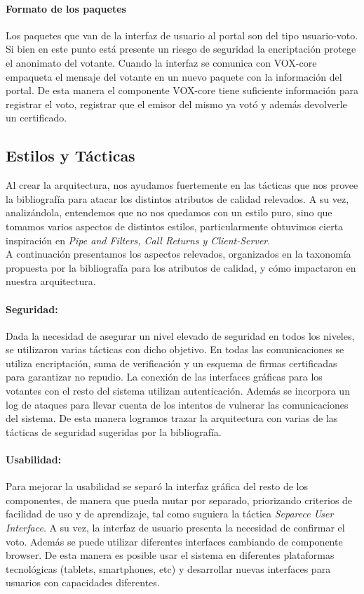 \paragraph{Formato de los paquetes} Los paquetes que van de la interfaz de usuario al portal son del tipo usuario-voto. Si bien en este punto está presente un riesgo de seguridad la encriptación protege el anonimato del votante. Cuando la interfaz se comunica con VOX-core empaqueta el mensaje del votante en un nuevo paquete con la información del portal. De esta manera el componente VOX-core tiene suficiente información para registrar el voto, registrar que el emisor del mismo ya votó y además devolverle un certificado.

\subsection{Estilos y Tácticas}

Al crear la arquitectura, nos ayudamos fuertemente en las tácticas que nos provee la bibliografía para atacar los distintos atributos de calidad relevados. A su vez, analizándola, entendemos que no nos quedamos con un estilo puro, sino que tomamos varios aspectos de distintos estilos, particularmente obtuvimos cierta inspiración en \textit{Pipe and Filters, Call Returns y Client-Server}. \\ A continuación presentamos los aspectos relevados, organizados en la taxonomía propuesta por la bibliografía para los atributos de calidad, y cómo impactaron en nuestra arquitectura.
 

\paragraph{Seguridad:}
Dada la necesidad de asegurar un nivel elevado de seguridad en todos los niveles, se utilizaron varias tácticas con dicho objetivo. En todas las comunicaciones se utiliza encriptación, suma de verificación y un esquema de firmas certificadas para garantizar no repudio. La conexión de las interfaces gráficas para los votantes con el resto del sistema utilizan autenticación. Además se incorpora un log de ataques para llevar cuenta de los intentos de vulnerar las comunicaciones del sistema. De esta manera logramos trazar la arquitectura con varias de las tácticas de seguridad sugeridas por la bibliografía.

\paragraph{Usabilidad:}
Para mejorar la usabilidad se separó la interfaz gráfica del resto de los componentes, de manera que pueda mutar por separado, priorizando criterios de facilidad de uso y de aprendizaje, tal como suguiera la táctica \textit{Separece User Interface}. A su vez, la interfaz de usuario presenta la necesidad de confirmar el voto. Además se puede utilizar diferentes interfaces cambiando de componente browser. De esta manera es posible usar el sistema en diferentes plataformas tecnológicas (tablets, smartphones, etc) y desarrollar nuevas interfaces para usuarios con capacidades diferentes.

